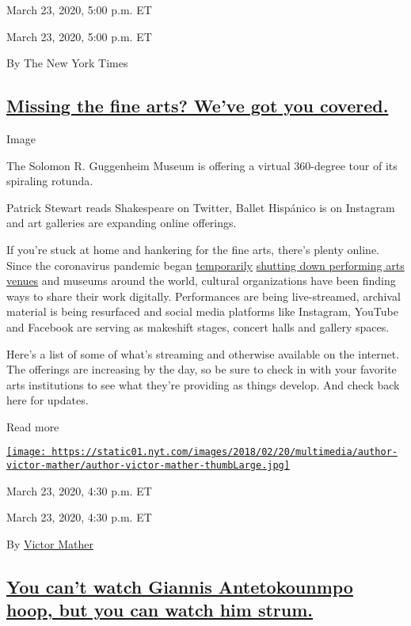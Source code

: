 March 23, 2020, 5:00 p.m. ET

March 23, 2020, 5:00 p.m. ET

By The New York Times

\hypertarget{missing-the-fine-arts-weve-got-you-covered}{%
\subsection{\texorpdfstring{\protect\hyperlink{missing-the-fine-arts-weve-got-you-covered}{Missing
the fine arts? We've got you
covered.}}{Missing the fine arts? We've got you covered.}}\label{missing-the-fine-arts-weve-got-you-covered}}

Image

The Solomon R. Guggenheim Museum is offering a virtual 360-degree tour
of its spiraling rotunda.

Patrick Stewart reads Shakespeare on Twitter, Ballet Hispánico is on
Instagram and art galleries are expanding online offerings.

If you're stuck at home and hankering for the fine arts, there's plenty
online. Since the coronavirus pandemic began
\href{https://www.nytimes.com/2020/03/12/theater/coronavirus-broadway-shutdown.html}{temporarily}
\href{https://www.nytimes.com/2020/03/12/arts/ny-events-cancellations-coronavirus.html}{shutting
down performing arts venues} and museums around the world, cultural
organizations have been finding ways to share their work digitally.
Performances are being live-streamed, archival material is being
resurfaced and social media platforms like Instagram, YouTube and
Facebook are serving as makeshift stages, concert halls and gallery
spaces.

Here's a list of some of what's streaming and otherwise available on the
internet. The offerings are increasing by the day, so be sure to check
in with your favorite arts institutions to see what they're providing as
things develop. And check back here for updates.

Read more

\href{https://www.nytimes.com/by/victor-mather}{\texttt{[image: https://static01.nyt.com/images/2018/02/20/multimedia/author-victor-mather/author-victor-mather-thumbLarge.jpg]}}

March 23, 2020, 4:30 p.m. ET

March 23, 2020, 4:30 p.m. ET

By \href{https://www.nytimes.com/by/victor-mather}{Victor Mather}

\hypertarget{you-cant-watch-giannis-antetokounmpo-hoop-but-you-can-watch-him-strum}{%
\subsection{\texorpdfstring{\protect\hyperlink{you-cant-watch-giannis-antetokounmpo-hoop-but-you-can-watch-him-strum}{You
can't watch Giannis Antetokounmpo hoop, but you can watch him
strum.}}{You can't watch Giannis Antetokounmpo hoop, but you can watch him strum.}}\label{you-cant-watch-giannis-antetokounmpo-hoop-but-you-can-watch-him-strum}}

